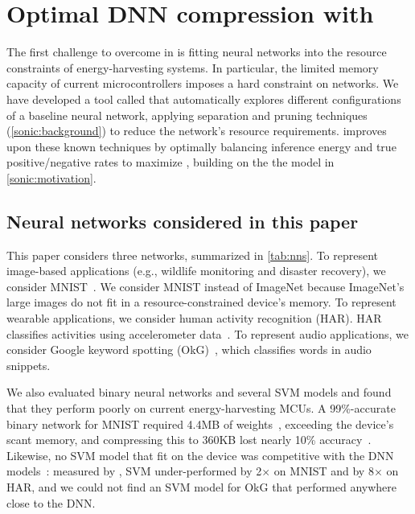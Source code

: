 \figGenesisNNs
\section{Optimal DNN compression with \genesis}
\label{sonic:genesis}

The first challenge to overcome in \sonictails is fitting neural networks into the
resource constraints of energy-harvesting systems.
%
In particular, the limited memory capacity of current microcontrollers
imposes a hard constraint on networks.
%
We have developed a tool called \genesis
that automatically
explores different configurations of a baseline neural network,
applying separation and pruning techniques (\autoref{sonic:background}) to reduce the network's resource requirements.
%
\genesis improves upon these known techniques by
optimally balancing inference energy and true positive/negative rates to maximize \metric,
building on the the model in \autoref{sonic:motivation}.

\subsection{Neural networks considered in this paper}

%
This paper considers three networks, summarized in \autoref{tab:nns}.
%
To represent image-based applications (e.g., wildlife monitoring and
disaster recovery), we consider MNIST~\cite{lecun1998mnist}. We consider
MNIST instead of ImageNet because ImageNet's large images 
do not fit in a resource-constrained device's memory.
%
To represent wearable applications, we consider human activity recognition
(HAR). HAR classifies activities using accelerometer data~\cite{har}.
%
To represent audio applications, we consider Google keyword
spotting (OkG)~\cite{okgoogle}, which classifies words in audio snippets.

We also evaluated binary neural networks and several SVM models
and found that they perform poorly on current energy-harvesting MCUs.
%
A 99\%-accurate binary network for MNIST required 4.4MB of weights~\cite{courbariaux2016binarized},
exceeding the device's scant memory, and compressing this to 360KB lost nearly 10\% accuracy~\cite{binarynetgithub}.
%
Likewise, no SVM model that fit on the device was competitive with 
the DNN models~\cite{lecun1998gradient}: measured by \metric, SVM under-performed 
by 2$\times$ on MNIST and by 8$\times$ on HAR, and we could not find an SVM model 
for OkG that performed anywhere close to the DNN.

